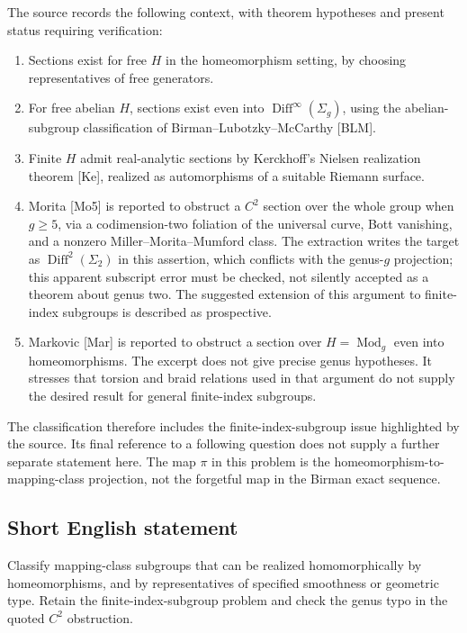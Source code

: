 \documentclass[11pt]{article}
\begin{document}
The source records the following context, with theorem hypotheses and present status requiring verification:
\begin{enumerate}
\item Sections exist for free $H$ in the homeomorphism setting, by choosing representatives of free generators.
\item For free abelian $H$, sections exist even into $\operatorname{Diff}^{\infty}(\Sigma_g)$, using the abelian-subgroup classification of Birman--Lubotzky--McCarthy [BLM].
\item Finite $H$ admit real-analytic sections by Kerckhoff's Nielsen realization theorem [Ke], realized as automorphisms of a suitable Riemann surface.
\item Morita [Mo5] is reported to obstruct a $C^2$ section over the whole group when $g\ge5$, via a codimension-two foliation of the universal curve, Bott vanishing, and a nonzero Miller--Morita--Mumford class. The extraction writes the target as $\operatorname{Diff}^2(\Sigma_2)$ in this assertion, which conflicts with the genus-$g$ projection; this apparent subscript error must be checked, not silently accepted as a theorem about genus two. The suggested extension of this argument to finite-index subgroups is described as prospective.
\item Markovic [Mar] is reported to obstruct a section over $H=\operatorname{Mod}_g$ even into homeomorphisms. The excerpt does not give precise genus hypotheses. It stresses that torsion and braid relations used in that argument do not supply the desired result for general finite-index subgroups.
\end{enumerate}
The classification therefore includes the finite-index-subgroup issue highlighted by the source. Its final reference to a following question does not supply a further separate statement here. The map $\pi$ in this problem is the homeomorphism-to-mapping-class projection, not the forgetful map in the Birman exact sequence.
\subsection{Short English statement}
Classify mapping-class subgroups that can be realized homomorphically by homeomorphisms, and by representatives of specified smoothness or geometric type. Retain the finite-index-subgroup problem and check the genus typo in the quoted $C^2$ obstruction.
\end{document}
